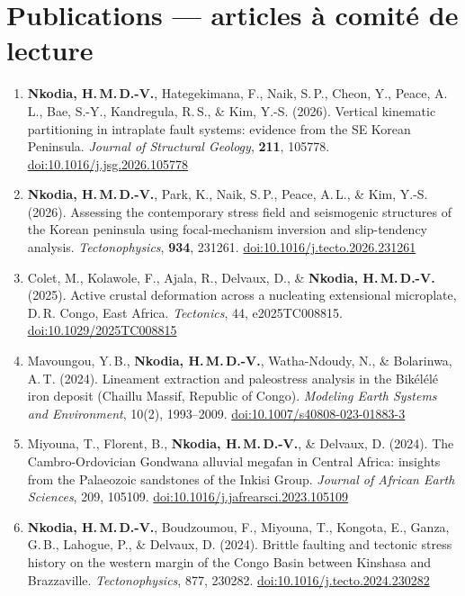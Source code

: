 \documentclass[11pt,a4paper]{article}
\begin{document}
\section{Publications — articles à comité de lecture}
\begin{enumerate}[leftmargin=1.6em, itemsep=3pt, topsep=2pt, label=\arabic*.]
\item \textbf{Nkodia, H.\,M.\,D.-V.}, Hategekimana, F., Naik, S.\,P., Cheon, Y., Peace, A.\,L., Bae, S.-Y., Kandregula, R.\,S., \& Kim, Y.-S. (2026). Vertical kinematic partitioning in intraplate fault systems: evidence from the SE Korean Peninsula. \emph{Journal of Structural Geology}, \textbf{211}, 105778. \href{https://doi.org/10.1016/j.jsg.2026.105778}{doi:10.1016/j.jsg.2026.105778}
\item \textbf{Nkodia, H.\,M.\,D.-V.}, Park, K., Naik, S.\,P., Peace, A.\,L., \& Kim, Y.-S. (2026). Assessing the contemporary stress field and seismogenic structures of the Korean peninsula using focal-mechanism inversion and slip-tendency analysis. \emph{Tectonophysics}, \textbf{934}, 231261. \href{https://doi.org/10.1016/j.tecto.2026.231261}{doi:10.1016/j.tecto.2026.231261}
\item Colet, M., Kolawole, F., Ajala, R., Delvaux, D., \& \textbf{Nkodia, H.\,M.\,D.-V.} (2025). Active crustal deformation across a nucleating extensional microplate, D.\,R. Congo, East Africa. \emph{Tectonics}, 44, e2025TC008815. \href{https://doi.org/10.1029/2025TC008815}{doi:10.1029/2025TC008815}
\item Mavoungou, Y.\,B., \textbf{Nkodia, H.\,M.\,D.-V.}, Watha-Ndoudy, N., \& Bolarinwa, A.\,T. (2024). Lineament extraction and paleostress analysis in the Bikélélé iron deposit (Chaillu Massif, Republic of Congo). \emph{Modeling Earth Systems and Environment}, 10(2), 1993–2009. \href{https://doi.org/10.1007/s40808-023-01883-3}{doi:10.1007/s40808-023-01883-3}
\item Miyouna, T., Florent, B., \textbf{Nkodia, H.\,M.\,D.-V.}, \& Delvaux, D. (2024). The Cambro-Ordovician Gondwana alluvial megafan in Central Africa: insights from the Palaeozoic sandstones of the Inkisi Group. \emph{Journal of African Earth Sciences}, 209, 105109. \href{https://doi.org/10.1016/j.jafrearsci.2023.105109}{doi:10.1016/j.jafrearsci.2023.105109}
\item \textbf{Nkodia, H.\,M.\,D.-V.}, Boudzoumou, F., Miyouna, T., Kongota, E., Ganza, G.\,B., Lahogue, P., \& Delvaux, D. (2024). Brittle faulting and tectonic stress history on the western margin of the Congo Basin between Kinshasa and Brazzaville. \emph{Tectonophysics}, 877, 230282. \href{https://doi.org/10.1016/j.tecto.2024.230282}{doi:10.1016/j.tecto.2024.230282}

\end{enumerate}
\end{document}
